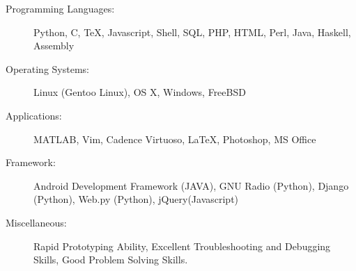 \documentclass[a4paper, 11pt]{article}
\makeatletter
\newcommand{\ressection}[1]
{\fcolorbox{black}{shadecolor}{\vbox{\hsize 0.98\textwidth \textbf{\mbox{~}{\@ \large #1} \vphantom{p\^{E}}}}}}
\makeatother
\begin{document}
\begin{description}
\item[\@ \@  \@ \@ \@ \@  \@ \@ Programming Languages:]
Python, C,  {\texfont \TeX}, Javascript, Shell, SQL, PHP, HTML, Perl, Java, Haskell, Assembly
\item[\@ \@  \@ \@ \@ \@  \@ \@ Operating Systems:]
Linux (Gentoo Linux), OS X, Windows, FreeBSD
\item[\@ \@  \@ \@ \@ \@  \@ \@ Applications:]
MATLAB, Vim, Cadence Virtuoso, {\texfont \LaTeX}, Photoshop, MS Office
\item[\@ \@  \@ \@ \@ \@  \@ \@ Framework:]
Android Development Framework (JAVA), GNU Radio (Python), Django (Python), Web.py (Python), jQuery(Javascript)
\item[\@ \@  \@ \@ \@ \@  \@ \@ Miscellaneous:]
Rapid Prototyping Ability, Excellent Troubleshooting and Debugging Skills, Good Problem Solving Skills. 
\end{description}



\end{document}

